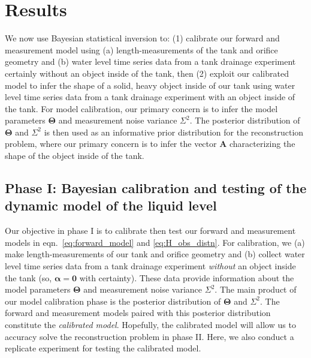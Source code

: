 \documentclass[openacc]{rsproca_new}%
\begin{document}
\section{Results}
We now use Bayesian statistical inversion to:
(1) calibrate our forward and measurement model using (a) length-measurements of the tank and orifice geometry and (b) water level time series data from a tank drainage experiment certainly without an object inside of the tank, then
(2) exploit our calibrated model to infer the shape of a solid, heavy object inside of our tank using water level time series data from a tank drainage experiment with an object inside of the tank.
For model calibration, our primary concern is to infer the model parameters $\boldsymbol \Theta$ and measurement noise variance $\Sigma^2$. The posterior distribution of $\boldsymbol \Theta$ and $\Sigma^2$ is then used as an informative prior distribution for the reconstruction problem, where our primary concern is to infer the vector $\mathbf{A}$ characterizing the shape of the object inside of the tank.

\subsection{Phase I: Bayesian calibration and testing of the dynamic model of the liquid level}
Our objective in phase I is to calibrate then test our forward and measurement models in eqn.~\ref{eq:forward_model} and \ref{eq:H_obs_distn}.
For calibration, we (a) make length-measurements of our tank and orifice geometry and (b) collect water level time series data from a tank drainage experiment \emph{without} an object inside the tank (so, $\boldsymbol \alpha = \mathbf{0}$ with certainty).
These data provide information about the model parameters $\boldsymbol \Theta$ and measurement noise variance $\Sigma^2$. 
The main product of our model calibration phase is the posterior distribution of $\boldsymbol \Theta$ and $\Sigma^2$.
The forward and measurement models paired with this posterior distribution constitute the \emph{calibrated model}. 
Hopefully, the calibrated model will allow us to accuracy solve the reconstruction problem in phase II. 
Here, we also conduct a replicate experiment for testing the calibrated model. 
\end{document}
